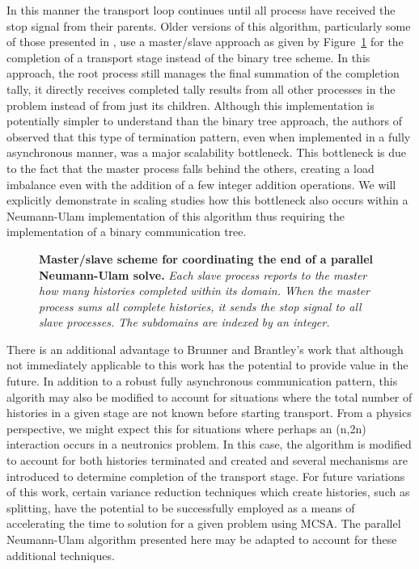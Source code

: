 In this manner the transport loop continues until all process have
received the stop signal from their parents. Older versions of this
algorithm, particularly some of those presented in
\citep{brunner_comparison_2006}, use a master/slave approach as given
by Figure~\ref{fig:master_comm_tree} for the completion of a transport
stage instead of the binary tree scheme. In this approach, the root
process still manages the final summation of the completion tally, it
directly receives completed tally results from all other processes in
the problem instead of from just its children. Although this
implementation is potentially simpler to understand than the binary
tree approach, the authors of \citep{brunner_comparison_2006} observed
that this type of termination pattern, even when implemented in a
fully asynchronous manner, was a major scalability bottleneck. This
bottleneck is due to the fact that the master process falls behind the
others, creating a load imbalance even with the addition of a few
integer addition operations. We will explicitly demonstrate in scaling
studies how this bottleneck also occurs within a Neumann-Ulam
implementation of this algorithm thus requiring the implementation of
a binary communication tree.

\begin{figure}[t!]
  \begin{center}
    \scalebox{0.75}{
       }
    \caption{\textbf{Master/slave scheme for coordinating the end of a
        parallel Neumann-Ulam solve.} \textit{Each slave process
        reports to the master how many histories completed within its
        domain. When the master process sums all complete histories,
        it sends the stop signal to all slave processes. The
        subdomains are indexed by an integer.}}
  \end{center}
  \label{fig:master_comm_tree}
\end{figure}

There is an additional advantage to Brunner and Brantley's work that
although not immediately applicable to this work has the potential to
provide value in the future. In addition to a robust fully
asynchronous communication pattern, this algorith may also be modified
to account for situations where the total number of histories in a
given stage are not known before starting transport. From a physics
perspective, we might expect this for situations where perhaps an
(n,2n) interaction occurs in a neutronics problem. In this case, the
algorithm is modified to account for both histories terminated and
created and several mechanisms are introduced to determine completion
of the transport stage. For future variations of this work, certain
variance reduction techniques which create histories, such as
splitting, have the potential to be successfully employed as a means
of accelerating the time to solution for a given problem using
MCSA. The parallel Neumann-Ulam algorithm presented here may be
adapted to account for these additional techniques.

